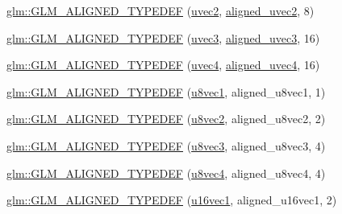 \begin{DoxyCompactItemize}
\item 
\hyperlink{group__gtx__type__aligned_ga94e86186978c502c6dc0c0d9c4a30679}{glm\+::\+G\+L\+M\+\_\+\+A\+L\+I\+G\+N\+E\+D\+\_\+\+T\+Y\+P\+E\+D\+EF} (\hyperlink{group__core__types_gafd2041b45eff671aa8899d2c2835eee9}{uvec2}, \hyperlink{group__gtc__type__aligned_gacddd39189c2dedf7dd48c02155279124}{aligned\+\_\+uvec2}, 8)
\item 
\hyperlink{group__gtx__type__aligned_ga5cec574686a7f3c8ed24bb195c5e2d0a}{glm\+::\+G\+L\+M\+\_\+\+A\+L\+I\+G\+N\+E\+D\+\_\+\+T\+Y\+P\+E\+D\+EF} (\hyperlink{group__core__types_gac4ba593917841b859ba1683b8b52b8fa}{uvec3}, \hyperlink{group__gtc__type__aligned_ga5dee635ca69be0f5de5630a59d89034f}{aligned\+\_\+uvec3}, 16)
\item 
\hyperlink{group__gtx__type__aligned_ga47edfdcee9c89b1ebdaf20450323b1d4}{glm\+::\+G\+L\+M\+\_\+\+A\+L\+I\+G\+N\+E\+D\+\_\+\+T\+Y\+P\+E\+D\+EF} (\hyperlink{group__core__types_ga1c426d19627b32b14f0089f7f4ba7b1d}{uvec4}, \hyperlink{group__gtc__type__aligned_ga1e0792f3c64836e042ee3aad9bd8209c}{aligned\+\_\+uvec4}, 16)
\item 
\hyperlink{group__gtx__type__aligned_ga5611d6718e3a00096918a64192e73a45}{glm\+::\+G\+L\+M\+\_\+\+A\+L\+I\+G\+N\+E\+D\+\_\+\+T\+Y\+P\+E\+D\+EF} (\hyperlink{group__gtc__type__precision_ga024be724ff45865952190522b03fc0d5}{u8vec1}, aligned\+\_\+u8vec1, 1)
\item 
\hyperlink{group__gtx__type__aligned_ga19837e6f72b60d994a805ef564c6c326}{glm\+::\+G\+L\+M\+\_\+\+A\+L\+I\+G\+N\+E\+D\+\_\+\+T\+Y\+P\+E\+D\+EF} (\hyperlink{group__gtc__type__precision_ga1c259b876f8757eb197b83a5fab476f0}{u8vec2}, aligned\+\_\+u8vec2, 2)
\item 
\hyperlink{group__gtx__type__aligned_ga9740cf8e34f068049b42a2753f9601c2}{glm\+::\+G\+L\+M\+\_\+\+A\+L\+I\+G\+N\+E\+D\+\_\+\+T\+Y\+P\+E\+D\+EF} (\hyperlink{group__gtc__type__precision_ga8262aeb120701de1b57773eb10be0f35}{u8vec3}, aligned\+\_\+u8vec3, 4)
\item 
\hyperlink{group__gtx__type__aligned_ga8b8588bb221448f5541a858903822a57}{glm\+::\+G\+L\+M\+\_\+\+A\+L\+I\+G\+N\+E\+D\+\_\+\+T\+Y\+P\+E\+D\+EF} (\hyperlink{group__gtc__type__precision_gaf3c840b8a90a194559121504ba599197}{u8vec4}, aligned\+\_\+u8vec4, 4)
\item 
\hyperlink{group__gtx__type__aligned_ga991abe990c16de26b2129d6bc2f4c051}{glm\+::\+G\+L\+M\+\_\+\+A\+L\+I\+G\+N\+E\+D\+\_\+\+T\+Y\+P\+E\+D\+EF} (\hyperlink{group__gtc__type__precision_ga809cb55e5fed3456686aae96e7e8684c}{u16vec1}, aligned\+\_\+u16vec1, 2)
\item 

\end{DoxyCompactItemize}
